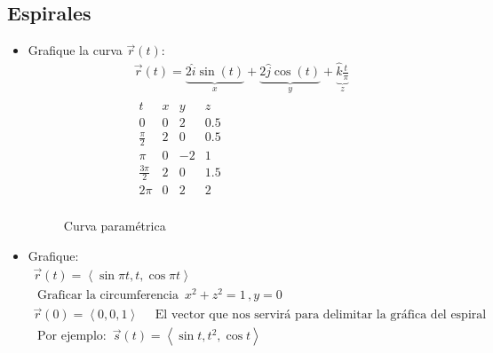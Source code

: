 \subsection{Espirales}
\begin{itemize}
    \item Grafique la curva $\vec{r}(t)$:
        \begin{align*}
            \vec{r}(t) = \underbrace{2 \hat{i} \sin (t)}_{x} + \underbrace{2 \hat{j} \cos (t) 
            }_{y} + \underbrace{\hat{k} \frac{t}{\pi}}_{z} \\ 
            \begin{matrix}
                t & x & y & z \\ 
                0 & 0 & 2 & 0.5 \\ 
                \frac{\pi}{2} & 2&  0&  0.5 \\ 
                \pi & 0 & -2&  1 \\ 
                \frac{3\pi}{2} & 2 &  0 & 1.5 \\   
                2\pi &  0 & 2 & 2 \\ 
            \end{matrix} 
        \end{align*}
        \begin{figure}[htbp]
            \centering
            \caption{Curva paramétrica}
            \label{}
        \end{figure}
    
    \item Grafique:
        \begin{align*}
            \vec{r}(t) = \left\langle \sin \pi t , t ,\cos \pi t \right\rangle \\ 
            \text{  Graficar la circumferencia  } \, x^2+z^2= 1\, , y = 0 \\ 
            \vec{r}(0) = \left\langle 0,0,1 \right\rangle \quad \text{  El vector que nos servirá para delimitar la gráfica del espiral  } \\
            \text{  Por ejemplo:   } \, \vec{s}(t) = \left\langle \sin t, t^2 , \cos t \right\rangle \\    
        \end{align*}
\end{itemize}



















